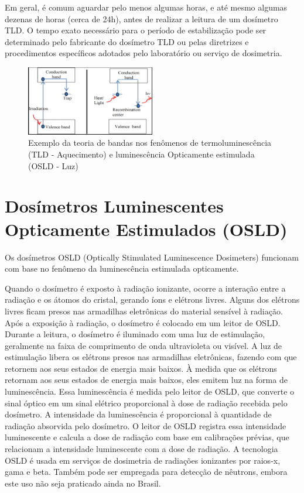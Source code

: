 \documentclass[11pt,a4paper]{article}
\begin{document}
		Em geral, é comum aguardar pelo menos algumas horas, e até mesmo algumas dezenas de horas (cerca de 24h), antes de realizar a leitura de um dosímetro TLD. O tempo exato necessário para o período de estabilização pode ser determinado pelo fabricante do dosímetro TLD ou pelas diretrizes e procedimentos específicos adotados pelo laboratório ou serviço de dosimetria.

		\begin{figure}[h]
			\centering
			\includegraphics[width=0.5\textwidth]{Imagens/tldOsld.jpg}
			\caption{Exemplo da teoria de bandas nos fenômenos de termoluminescência (TLD - Aquecimento) e luminescência Opticamente estimulada (OSLD - Luz)}
			\label{}
		\end{figure}

	\section{Dosímetros Luminescentes Opticamente Estimulados (OSLD)}

		Os dosímetros OSLD (Optically Stimulated Luminescence Dosimeters) funcionam com base no fenômeno da luminescência estimulada opticamente. 

		Quando o dosímetro é exposto à radiação ionizante, ocorre a interação entre a radiação e os átomos do cristal, gerando íons e elétrons livres. Alguns dos elétrons livres ficam presos nas armadilhas eletrônicas do material sensível à radiação. Após a exposição à radiação, o dosímetro é colocado em um leitor de OSLD. Durante a leitura, o dosímetro é iluminado com uma luz de estimulação, geralmente na faixa de comprimento de onda ultravioleta ou visível. A luz de estimulação libera os elétrons presos nas armadilhas eletrônicas, fazendo com que retornem aos seus estados de energia mais baixos. À medida que os elétrons retornam aos seus estados de energia mais baixos, eles emitem luz na forma de luminescência. Essa luminescência é medida pelo leitor de OSLD, que converte o sinal óptico em um sinal elétrico proporcional à dose de radiação recebida pelo dosímetro. A intensidade da luminescência é proporcional à quantidade de radiação absorvida pelo dosímetro. O leitor de OSLD registra essa intensidade luminescente e calcula a dose de radiação com base em calibrações prévias, que relacionam a intensidade luminescente com a dose de radiação. A tecnologia OSLD é usada em serviços de dosimetria de radiações ionizantes por raios-x, gama e beta. Também pode ser empregada para detecção de nêutrons, embora este uso não seja praticado ainda no Brasil.
\end{document}
